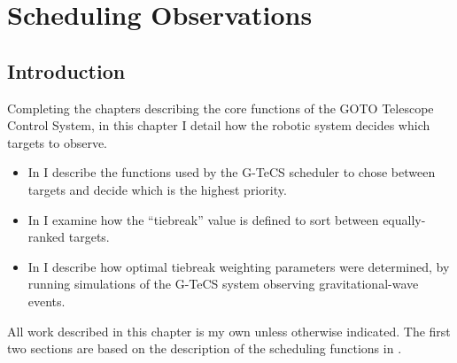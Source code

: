 \chapter{Scheduling Observations}
\label{chap:scheduling}
\chaptoc{}


\newpage
\section{Introduction}
\label{sec:scheduling_intro}
\begin{colsection}

Completing the chapters describing the core functions of the GOTO Telescope Control System, in this chapter I detail how the robotic system decides which targets to observe.
%
\begin{itemize}
    \item In  I describe the functions used by the G\nobreakdash-TeCS scheduler to chose between targets and decide which is the highest priority.
    \item In  I examine how the ``tiebreak'' value is defined to sort between equally-ranked targets.
    \item In  I describe how optimal tiebreak weighting parameters were determined, by running simulations of the G-TeCS system observing gravitational-wave events.
\end{itemize}
%
All work described in this chapter is my own unless otherwise indicated. The first two sections are based on the description of the scheduling functions in \citet{Dyer}.

\end{colsection}


\newpage
